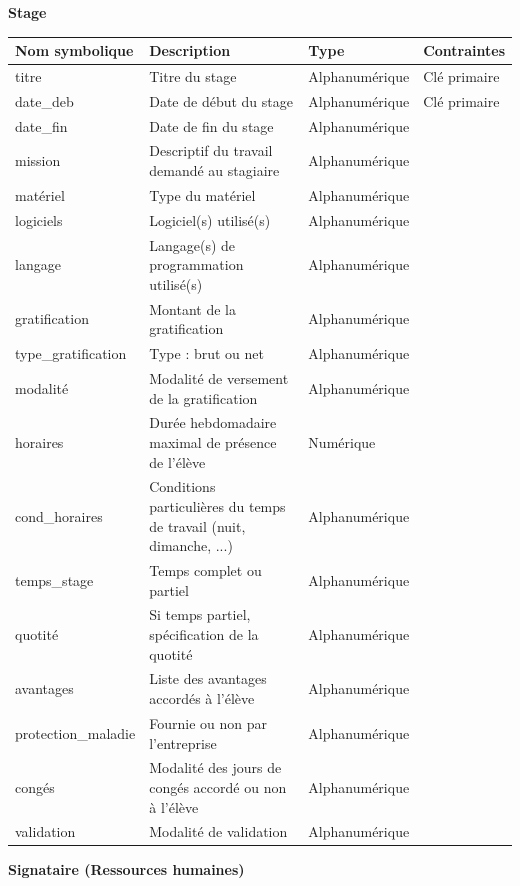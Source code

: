 \documentclass{scrreprt}
\begin{document}
\newpage
\begin{flushleft}
\textbf{Stage}
\end{flushleft}

\begin{tabular}{|l|p{6cm}|l|l|}
\hline
\textbf{Nom symbolique} & \textbf{Description} & \textbf{Type} & \textbf{Contraintes} \\
\hline
titre & Titre du stage & Alphanumérique & Clé primaire \\
date\_deb & Date de début du stage & Alphanumérique & Clé primaire \\
date\_fin & Date de fin du stage & Alphanumérique & \\
mission & Descriptif du travail demandé au stagiaire & Alphanumérique & \\
matériel & Type du matériel & Alphanumérique & \\
logiciels & Logiciel(s) utilisé(s) & Alphanumérique & \\
langage & Langage(s) de programmation utilisé(s) & Alphanumérique & \\
gratification & Montant de la gratification & Alphanumérique & \\
type\_gratification & Type : brut ou net & Alphanumérique & \\
modalité & Modalité de versement de la gratification & Alphanumérique & \\
horaires & Durée hebdomadaire maximal de présence de l'élève & Numérique & \\
cond_horaires & Conditions particulières du temps de travail (nuit, dimanche, ...) & Alphanumérique & \\
temps_stage & Temps complet ou partiel & Alphanumérique & \\
quotité & Si temps partiel, spécification de la quotité & Alphanumérique & \\
avantages & Liste des avantages accordés à l’élève & Alphanumérique & \\
protection\_maladie & Fournie ou non par l'entreprise & Alphanumérique & \\
congés & Modalité des jours de congés accordé ou non à l'élève & Alphanumérique &\\
validation & Modalité de validation & Alphanumérique & \\
\hline
\end{tabular}

\begin{flushleft}
\textbf{Signataire (Ressources humaines)}
\end{flushleft}
\end{document}
